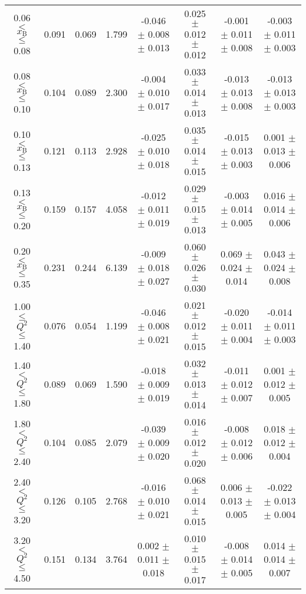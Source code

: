 \begin{table}[width=15cm]
\begin{center}
{\begin{tabular}{|c|c|c|c|c|c|c|c|}
0.06 $<$ $x_{\textrm{B}}$ $\leqslant$ 0.08 &  0.091 & 0.069 &  1.799 &   -0.046  $\pm$  0.008  $\pm$   0.013 &
0.025  $\pm$  0.012  $\pm$   0.012 & -0.001  $\pm$ 0.011  $\pm$   0.008 & -0.003   $\pm$  0.011   $\pm$   0.003\\
0.08 $<$ $x_{\textrm{B}}$ $\leqslant$ 0.10 &  0.104 & 0.089 &  2.300 &  -0.004  $\pm$  0.010  $\pm$   0.017 & 
0.033  $\pm$  0.014  $\pm$   0.013 & -0.013 $\pm$  0.013 $\pm$    0.008 & -0.013   $\pm$  0.013    $\pm$  0.003\\
0.10 $<$ $x_{\textrm{B}}$ $\leqslant$ 0.13 &  0.121 &  0.113 &  2.928 &  -0.025  $\pm$  0.010  $\pm$   0.018 & 
0.035  $\pm$  0.014 $\pm$   0.015 & -0.015 $\pm$  0.013  $\pm$   0.003 & 0.001   $\pm$  0.013  $\pm$    0.006\\
0.13 $<$ $x_{\textrm{B}}$ $\leqslant$ 0.20 &  0.159 & 0.157 &  4.058&   -0.012   $\pm$ 0.011  $\pm$   0.019 & 
0.029  $\pm$  0.015 $\pm$    0.013 & -0.003  $\pm$  0.014  $\pm$   0.005 & 0.016   $\pm$  0.014   $\pm$  0.006\\
0.20 $<$ $x_{\textrm{B}}$ $\leqslant$ 0.35 &  0.231 & 0.244 &  6.139 &  -0.009 $\pm$  0.018   $\pm$  0.027 & 
0.060  $\pm$  0.026   $\pm$    0.030 & 0.069  $\pm$  0.024  $\pm$   0.014 & 0.043  $\pm$   0.024  $\pm$   0.008\\
\hline
1.00 $\leqslant$ $Q^{2}$ $\leqslant$ 1.40 &  0.076 & 0.054  & 1.199 &  -0.046  $\pm$  0.008  $\pm$   0.021 & 
0.021  $\pm$  0.012  $\pm$   0.015 &  -0.020 $\pm$  0.011  $\pm$  0.004 & -0.014  $\pm$  0.011   $\pm$   0.003\\
1.40 $<$ $Q^{2}$ $\leqslant$ 1.80 &  0.089 & 0.069 &  1.590 &  -0.018  $\pm$  0.009  $\pm$   0.019 & 
0.032  $\pm$  0.013  $\pm$   0.014 & -0.011  $\pm$  0.012  $\pm$  0.007 & 0.001  $\pm$  0.012   $\pm$  0.005\\
1.80 $<$ $Q^{2}$ $\leqslant$ 2.40 &  0.104 & 0.085 &  2.079 &  -0.039  $\pm$  0.009  $\pm$   0.020 &
0.016  $\pm$  0.012  $\pm$   0.020 & -0.008 $\pm$   0.012  $\pm$  0.006 & 0.018  $\pm$   0.012  $\pm$  0.004\\
2.40 $<$ $Q^{2}$ $\leqslant$ 3.20 &  0.126 & 0.105  & 2.768 &  -0.016 $\pm$   0.010  $\pm$   0.021 &  
0.068  $\pm$  0.014  $\pm$   0.015 & 0.006  $\pm$  0.013  $\pm$  0.005 & -0.022  $\pm$  0.013  $\pm$  0.004\\
3.20 $<$ $Q^{2}$ $\leqslant$ 4.50 &  0.151 & 0.134 &  3.764 &  0.002  $\pm$  0.011   $\pm$  0.018 & 
0.010 $\pm$   0.015  $\pm$   0.017 & -0.008  $\pm$  0.014 $\pm$ 0.005 & 0.014   $\pm$  0.014  $\pm$  0.007\\

\end{tabular}}
\end{center}
\end{table}
